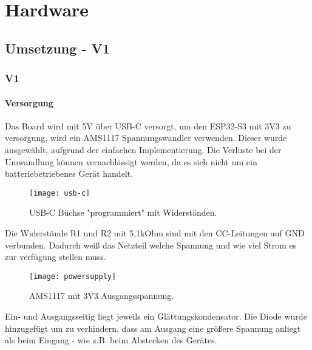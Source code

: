 \graphicspath{ {HW-PIC/} }


\chapter{Hardware}

    \section{Umsetzung - V1}
    
    \subsection{V1}
        \subsubsection{Versorgung}
        Das Board wird mit 5V über USB-C versorgt, um den ESP32-S3 mit 3V3 zu 
        versorgung, wird ein AMS1117 Spannungswandler verwenden. Dieser wurde ausgewählt, 
        aufgrund der einfachen Implementierung. Die Verluste bei der Umwandlung können vernachlässigt werden, da 
        es sich nicht um ein batteriebetriebenes Gerät handelt.

            \begin{figure}[h]
                \centering
                \texttt{[image: usb-c]}
                \caption{USB-C Büchse "programmiert" mit Widerständen.}
                \label{fig:sch1}

            \end{figure}

        Die Widerstände R1 und R2 mit 5,1kOhm sind mit den CC-Leitungen auf GND verbunden.
        Dadurch weiß das Netzteil welche Spannung und wie viel Strom es zur verfügung stellen
        muss. 

            \begin{figure}[h]
                \centering
                \texttt{[image: powersupply]}
                \caption{AMS1117 mit 3V3 Ausgangsspannung.}
                \label{fig:sch2}
                
            \end{figure}

        Ein- und Ausgangsseitig liegt jeweils ein Glättungskondensator. Die Diode wurde hinzugefügt 
        um zu verhindern, dass am Ausgang eine größere Spannung
        anliegt als beim Eingang - wie z.B. beim Abstecken des Gerätes.

